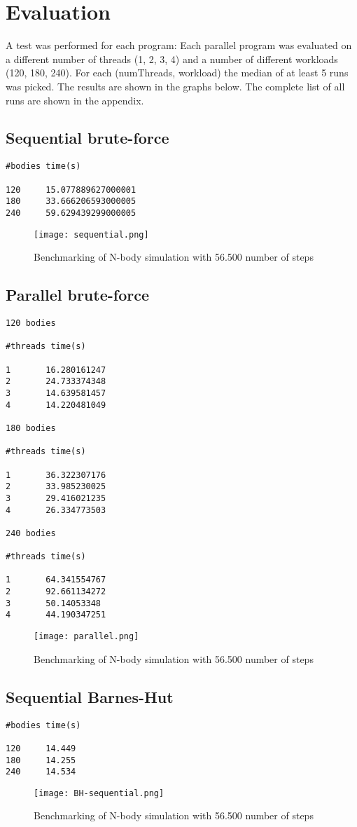 \documentclass{article}
\begin{document}
\section{Evaluation}
A test was performed for each program: Each parallel program was evaluated on a different number of threads (1, 2, 3, 4) and a number of different workloads (120, 180, 240). For each (numThreads, workload) the median of at least 5 runs was picked. The results are shown in the graphs below. The complete list of all runs are shown in the appendix.

\subsection{Sequential brute-force}
\begin{verbatim}
#bodies time(s)

120     15.077889627000001
180     33.666206593000005
240     59.629439299000005
\end{verbatim}
\begin{figure}[h]
\centering
\texttt{[image: sequential.png]}
\caption{Benchmarking of N-body simulation with 56.500 number of steps}
\end{figure}      

\subsection{Parallel brute-force}
\begin{verbatim}
120 bodies

#threads time(s)

1       16.280161247
2       24.733374348
3       14.639581457
4       14.220481049

180 bodies 

#threads time(s)

1       36.322307176  
2       33.985230025  
3       29.416021235
4       26.334773503

240 bodies

#threads time(s)

1       64.341554767 
2       92.661134272 
3       50.14053348 
4       44.190347251
\end{verbatim}
\begin{figure}[h]
\centering
\texttt{[image: parallel.png]}
\caption{Benchmarking of N-body simulation with 56.500 number of steps}
\end{figure}      

\clearpage
\subsection{Sequential Barnes-Hut}
\begin{verbatim}
#bodies time(s)

120     14.449
180     14.255
240     14.534
\end{verbatim}
\begin{figure}[h]
\centering
\texttt{[image: BH-sequential.png]}
\caption{Benchmarking of N-body simulation with 56.500 number of steps}
\end{figure}      
\clearpage
\end{document}
